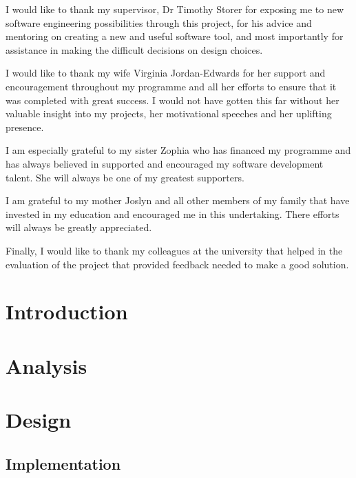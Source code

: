\documentclass{mproj}
\begin{document}
I would like to thank my supervisor, Dr Timothy Storer for exposing me to new software engineering possibilities through this project, for his advice and mentoring on creating a new and useful software tool, and most importantly for assistance in making the difficult decisions on design choices.

I would like to thank my wife Virginia Jordan-Edwards for her support and encouragement throughout my programme and all her efforts to ensure that it was completed with great success. I would not have gotten this far without her valuable insight into my projects, her motivational speeches and her uplifting presence.

I am especially grateful to my sister Zophia who has financed my programme and has always believed in supported and encouraged my software development talent. She will always be one of my greatest supporters.

I am grateful to my mother Joslyn and all other members of my family that have invested in my education and encouraged me in this undertaking. There efforts will always be greatly appreciated.

Finally, I would like to thank my colleagues at the university that helped in the evaluation of the project that provided feedback needed to make a good solution.

\tableofcontents

\chapter{Introduction}\label{intro}



\chapter{Analysis}\label{analysis}

\chapter{Design}\label{design}

\section{Implementation}
\end{document}
